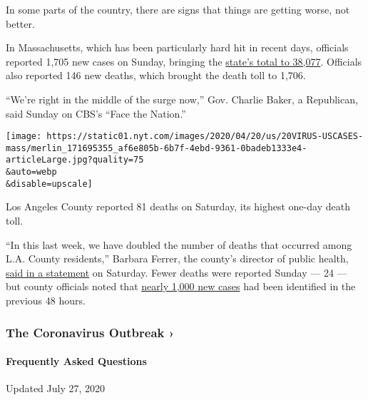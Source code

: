 In some parts of the country, there are signs that things are getting
worse, not better.

In Massachusetts, which has been particularly hard hit in recent days,
officials reported 1,705 new cases on Sunday, bringing the
\href{https://www.nytimes.com/interactive/2020/us/massachusetts-coronavirus-cases.html}{state's
total to 38,077}. Officials also reported 146 new deaths, which brought
the death toll to 1,706.

``We're right in the middle of the surge now,'' Gov. Charlie Baker, a
Republican, said Sunday on CBS's ``Face the Nation.''

\texttt{[image: https://static01.nyt.com/images/2020/04/20/us/20VIRUS-USCASES-mass/merlin\_171695355\_af6e805b-6b7f-4ebd-9361-0badeb1333e4-articleLarge.jpg?quality=75\\\&auto=webp\\\&disable=upscale]}

Los Angeles County reported 81 deaths on Saturday, its highest one-day
death toll.

``In this last week, we have doubled the number of deaths that occurred
among L.A. County residents,'' Barbara Ferrer, the county's director of
public health,
\href{http://publichealth.lacounty.gov/phcommon/public/media/mediapubhpdetail.cfm?prid=2325}{said
in a statement} on Saturday. Fewer deaths were reported Sunday --- 24
--- but county officials noted that
\href{http://publichealth.lacounty.gov/phcommon/public/media/mediapubhpdetail.cfm?prid=2326}{nearly
1,000 new cases} had been identified in the previous 48 hours.

\href{https://www.nytimes.com/news-event/coronavirus?action=click\&pgtype=Article\&state=default\&region=MAIN_CONTENT_3\&context=storylines_faq}{}

\hypertarget{the-coronavirus-outbreak-}{%
\subsubsection{The Coronavirus Outbreak
›}\label{the-coronavirus-outbreak-}}

\hypertarget{frequently-asked-questions}{%
\paragraph{Frequently Asked
Questions}\label{frequently-asked-questions}}

Updated July 27, 2020

